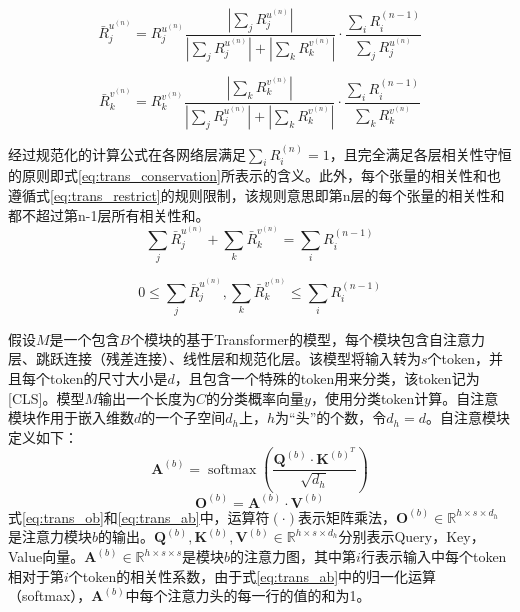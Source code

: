 \begin{equation}
	\bar{R}_{j}^{u^{(n)}}=R_{j}^{u^{(n)}} \frac{\left|\sum_{j} R_{j}^{u^{(n)}}\right|}{\left|\sum_{j} R_{j}^{u^{(n)}}\right|+\left|\sum_{k} R_{k}^{v^{(n)}}\right|} \cdot \frac{\sum_{i} R_{i}^{(n-1)}}{\sum_{j} R_{j}^{u^{(n)}}}
	\label{eq:trans_Ru}
\end{equation}

\begin{equation}
	\bar{R}_{k}^{v^{(n)}}=R_{k}^{v^{(n)}} \frac{\left|\sum_{k} R_{k}^{v^{(n)}}\right|}{\left|\sum_{j} R_{j}^{u^{(n)}}\right|+\left|\sum_{k} R_{k}^{v^{(n)}}\right|} \cdot \frac{\sum_{i} R_{i}^{(n-1)}}{\sum_{k} R_{k}^{v^{(n)}}}
	\label{eq:trans_Rv}
\end{equation}

经过规范化的计算公式在各网络层满足$\sum_{i} R_{i}^{(n)}=1$，且完全满足各层相关性守恒的原则即式\ref{eq:trans_conservation}所表示的含义。此外，每个张量的相关性和也遵循式\ref{eq:trans_restrict}的规则限制，该规则意思即第n层的每个张量的相关性和都不超过第n-1层所有相关性和。
\begin{equation}
	\sum_{j} \bar{R}_{j}^{u^{(n)}}+ \sum_{k} \bar{R}_{k}^{v^{(n)}} =\sum_{i} R_{i}^{(n-1)}
	\label{eq:trans_conservation}
\end{equation}

\begin{equation}
	0 \leq \sum_{j} \bar{R}_{j}^{u^{(n)}}, \sum_{k} \bar{R}_{k}^{v^{(n)}} \leq \sum_{i} R_{i}^{(n-1)}
	\label{eq:trans_restrict}
\end{equation}

假设$M$是一个包含$B$个模块的基于Transformer的模型，每个模块包含自注意力层、跳跃连接（残差连接）、线性层和规范化层。该模型将输入转为$s$个token，并且每个token的尺寸大小是$d$，且包含一个特殊的token用来分类，该token记为[CLS]。模型$M$输出一个长度为$C$的分类概率向量$y$，使用分类token计算。自注意模块作用于嵌入维数$d$的一个子空间$d_h$上，$h$为“头”的个数，令$d_h=d$。自注意模块定义如下：
\begin{equation}
	\mathbf{A}^{(b)}=\operatorname{softmax}\left(\frac{\mathbf{Q}^{(b)} \cdot \mathbf{K}^{(b)^{T}}}{\sqrt{d_{h}}}\right) 
	\label{eq:trans_ab}
\end{equation}
\begin{equation}
	\mathbf{O}^{(b)}=\mathbf{A}^{(b)} \cdot \mathbf{V}^{(b)}
	\label{eq:trans_ob}
\end{equation}
式\ref{eq:trans_ob}和\ref{eq:trans_ab}中，运算符$(\cdot)$表示矩阵乘法，$\mathbf{O}^{(b)} \in \mathbb{R}^{h\times s \times d_h}$是注意力模块$b$的输出。$\mathbf{Q}^{(b)},\mathbf{K}^{(b)},\mathbf{V}^{(b)} \in \mathbb{R}^{h\times s \times d_h}$分别表示Query，Key，Value向量。$\mathbf{A}^{(b)} \in \mathbb{R}^{h\times s \times s}$是模块$b$的注意力图，其中第$i$行表示输入中每个token相对于第$i$个token的相关性系数，由于式\ref{eq:trans_ab}中的归一化运算（softmax），$\mathbf{A}^{(b)}$中每个注意力头的每一行的值的和为1。

